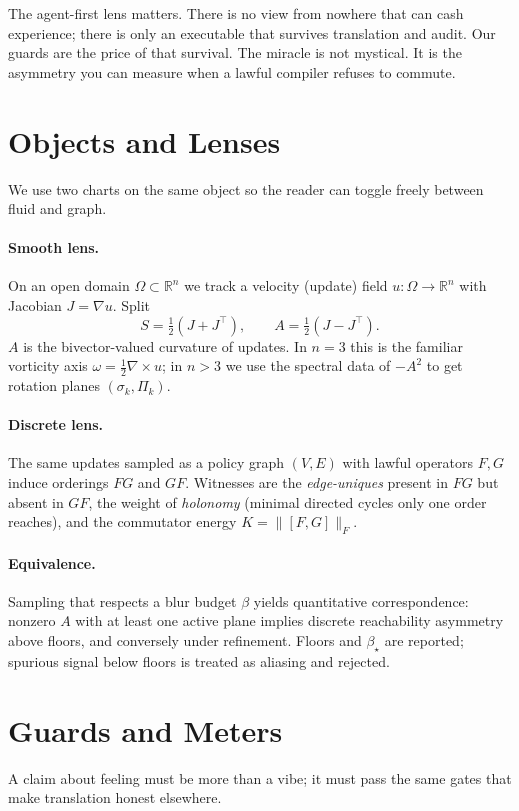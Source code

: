 \documentclass[11pt]{article}
\newcommand{\R}{\mathbb{R}}
\newcommand{\1}{\mathbf{1}}
\newcommand{\J}{J}
\newcommand{\Ssym}{S}   %
\newcommand{\Aanti}{A}  %
\newcommand{\Blur}{\beta}
\begin{document}
The agent-first lens matters. There is no view from nowhere that can cash experience; there is only an executable that survives translation and audit. Our guards are the price of that survival. The miracle is not mystical. It is the asymmetry you can measure when a lawful compiler refuses to commute.

\section{Objects and Lenses}
We use two charts on the same object so the reader can toggle freely between fluid and graph.

\paragraph{Smooth lens.} On an open domain $\Omega\subset\R^n$ we track a velocity (update) field $u:\Omega\to\R^n$ with Jacobian $\J=\nabla u$. Split
\[
\Ssym=\tfrac12(\J+\J^\top),\qquad \Aanti=\tfrac12(\J-\J^\top).
\]
$\Aanti$ is the bivector-valued curvature of updates. In $n=3$ this is the familiar vorticity axis $\omega=\tfrac12\nabla\times u$; in $n>3$ we use the spectral data of $-\Aanti^2$ to get rotation planes $(\sigma_k,\Pi_k)$.

\paragraph{Discrete lens.} The same updates sampled as a policy graph $(V,E)$ with lawful operators $F,G$ induce orderings $FG$ and $GF$. Witnesses are the \emph{edge-uniques} present in $FG$ but absent in $GF$, the weight of \emph{holonomy} (minimal directed cycles only one order reaches), and the commutator energy $K=\|[F,G]\|_F$.

\paragraph{Equivalence.} Sampling that respects a blur budget $\Blur$ yields quantitative correspondence: nonzero $\Aanti$ with at least one active plane implies discrete reachability asymmetry above floors, and conversely under refinement. Floors and $\Blur_\star$ are reported; spurious signal below floors is treated as aliasing and rejected.

\section{Guards and Meters}
A claim about feeling must be more than a vibe; it must pass the same gates that make translation honest elsewhere.
\end{document}
